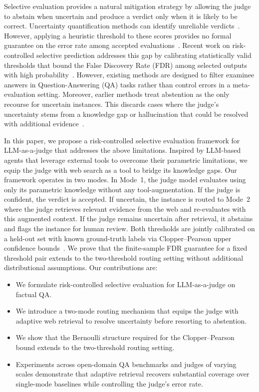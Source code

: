 Selective evaluation provides a natural mitigation strategy by allowing the judge to abstain when uncertain and produce a verdict only when it is likely to be correct. Uncertainty quantification methods can identify unreliable verdicts~\citep{10.1145/3744238}. However, applying a heuristic threshold to these scores provides no formal guarantee on the error rate among accepted evaluations~\citep{scope}. Recent work on risk-controlled selective prediction addresses this gap by calibrating statistically valid thresholds that bound the False Discovery Rate (FDR) among selected outputs with high probability~\citep{safer, wang2025coin}. However, existing methods are designed to filter examinee answers in Question-Answering (QA) tasks rather than control errors in a meta-evaluation setting. Moreover, earlier methods treat abstention as the only recourse for uncertain instances. This discards cases where the judge's uncertainty stems from a knowledge gap or hallucination that could be resolved with additional evidence~\citep{tale_sb}.

In this paper, we propose a risk-controlled selective evaluation framework for LLM-as-a-judge that addresses the above limitations. Inspired by LLM-based agents that leverage external tools to overcome their parametric limitations, we equip the judge with web search as a tool to bridge its knowledge gaps. Our framework operates in two modes. In Mode~1, the judge model evaluates using only its parametric knowledge without any tool-augmentation. If the judge is confident, the verdict is accepted. If uncertain, the instance is routed to Mode~2 where the judge retrieves relevant evidence from the web and re-evaluates with this augmented context. If the judge remains uncertain after retrieval, it abstains and flags the instance for human review. Both thresholds are jointly calibrated on a held-out set with known ground-truth labels via Clopper--Pearson upper confidence bounds~\citep{be7c0fd0_cp}. We prove that the finite-sample FDR guarantee for a fixed threshold pair extends to the two-threshold routing setting without additional distributional assumptions. Our contributions are:
\begin{itemize}
\item We formulate risk-controlled selective evaluation for LLM-as-a-judge on factual QA.
\item We introduce a two-mode routing mechanism that equips the judge with adaptive web retrieval to resolve uncertainty before resorting to abstention.
\item We show that the Bernoulli structure required for the Clopper--Pearson bound extends to the two-threshold routing setting.
\item Experiments across open-domain QA benchmarks and judges of varying scales demonstrate that adaptive retrieval recovers substantial coverage over single-mode baselines while controlling the judge's error rate.
\end{itemize}